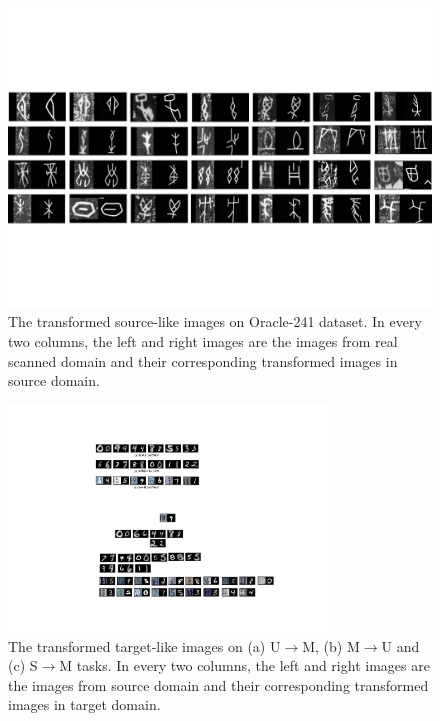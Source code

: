 \documentclass[10pt,journal,compsoc,twocolumn ]{IEEEtran}
\begin{document}
\begin{figure}
\centering
\includegraphics[width=16cm]{transformed_source_data.pdf}
\caption{The transformed source-like images on Oracle-241 dataset. In every two columns, the left and right images are the images from real scanned domain and their corresponding transformed images in source domain.}
\label{transfromed_handprint} %
\end{figure}

\begin{figure}
\centering
\includegraphics[width=8.5cm]{generate_usps2mnist.pdf}
\caption{The transformed target-like images on (a) U$\rightarrow $M, (b) M$\rightarrow $U and (c) S$\rightarrow $M tasks. In every two columns, the left and right images are the images from source domain and their corresponding transformed images in target domain.}
\label{transform_digit} %
\end{figure}
\end{document}
